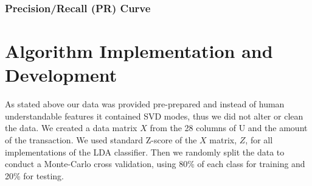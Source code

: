 \documentclass{article}
\begin{document}
\subsubsection{Precision/Recall (PR) Curve}
%
%
%
%
%

\section{Algorithm Implementation and Development}

As stated above our data was provided pre-prepared and instead of human understandable features it contained SVD modes, thus we did not alter or clean the data.
We created a  data matrix $X$ from the 28 columns of U and the amount of the transaction.
We used standard Z-score of the $X$ matrix, $Z$, for all implementations of the LDA classifier.
Then we randomly split the data to conduct a Monte-Carlo cross validation, using 80\% of each class for training and 20\% for testing.
\end{document}

